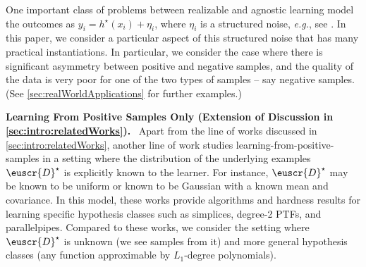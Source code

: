 \documentclass[11pt]{article}
\theoremstyle{plain}
\theoremstyle{definition}
\theoremstyle{remark}
\newcommand{\customcal}[1]{\euscr{#1}}
\newcommand{\cD}{\customcal{D}}
\renewcommand{\paragraph}[1]{\medskip \noindent\textbf{#1}~}
\newcommand{\eg}{\textit{e.g.}}
\newcommand{\cDtrue}{\cD^\star}
\begin{document}
        One important class of problems between realizable and agnostic learning model the outcomes as $y_i = h^{\star}(x_i) + \eta_i$, where $\eta_i$ is a structured noise, \eg{}, see \cite{angluin1988learning, decatur1997cpcn, blum1998polynomial, feldman2006new, natarajan2013learning}.  In this paper, we consider a particular aspect of this structured noise that has many practical instantiations. In particular, we consider the case where there is significant asymmetry between positive and negative samples, and the quality of the data is very poor for one of the two types of samples -- say negative samples. (See \cref{sec:realWorldApplications} for further examples.)
    
         \paragraph{Learning From Positive Samples Only (Extension of Discussion in \cref{sec:intro:relatedWorks}).} 
         Apart from the line of works discussed in \cref{sec:intro:relatedWorks}, another line of work \cite{frieze1996linearTransformations,Nguyen2009learningParallelepiped,Rademacher2009hardnessOfLearningConvex,anderson2013simplices,de2015satisfying,canonne2020satisfying,he2023robustMoments} studies learning-from-positive-samples in a setting where the distribution of the underlying examples $\cDtrue$ is explicitly known to the learner.
         For instance, $\cDtrue$ may be known to be uniform or known to be Gaussian with a known mean and covariance.
         In this model, these works provide algorithms and hardness results for learning specific hypothesis classes such as simplices, degree-2 PTFs, and parallelpipes. 
         Compared to these works, we consider the setting where $\cDtrue$ is unknown (we see samples from it) and more general hypothesis classes (any function approximable by $L_1$-degree polynomials).
\end{document}
